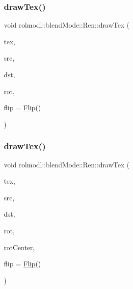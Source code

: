 \mbox{\label{classrolmodl_1_1blend_mode_1_1_ren_a9a98d8e5c0195f9f0a0a016fd9dfaf0b}} 
\subsubsection{\texorpdfstring{drawTex()}{drawTex()}\hspace{0.1cm}{\footnotesize\ttfamily [32/36]}}
{\footnotesize\ttfamily void rolmodl\+::blend\+Mode\+::\+Ren\+::draw\+Tex (\begin{DoxyParamCaption}\item[{Tex \&}]{tex,  }\item[{const \mbox{\hyperlink{structrolmodl_1_1blend_mode_1_1_src_rect_x_y}{Src\+Rect\+XY}}}]{src,  }\item[{const \mbox{\hyperlink{structrolmodl_1_1blend_mode_1_1_dst_rect_x_y}{Dst\+Rect\+XY}}}]{dst,  }\item[{const double}]{rot,  }\item[{const \mbox{\hyperlink{structrolmodl_1_1blend_mode_1_1_flip}{Flip}}}]{flip = {\ttfamily \mbox{\hyperlink{structrolmodl_1_1blend_mode_1_1_flip}{Flip}}()} }\end{DoxyParamCaption})}

\mbox{\label{classrolmodl_1_1blend_mode_1_1_ren_adf77534fcf212ab386ee2bb224ed4bce}} 
\subsubsection{\texorpdfstring{drawTex()}{drawTex()}\hspace{0.1cm}{\footnotesize\ttfamily [33/36]}}
{\footnotesize\ttfamily void rolmodl\+::blend\+Mode\+::\+Ren\+::draw\+Tex (\begin{DoxyParamCaption}\item[{Tex \&}]{tex,  }\item[{const \mbox{\hyperlink{structrolmodl_1_1blend_mode_1_1_src_rect_w_h}{Src\+Rect\+WH}}}]{src,  }\item[{const \mbox{\hyperlink{structrolmodl_1_1blend_mode_1_1_dst_rect_w_h}{Dst\+Rect\+WH}}}]{dst,  }\item[{const double}]{rot,  }\item[{const \mbox{\hyperlink{structrolmodl_1_1geom_1_1_pos}{geom\+::\+Pos}}}]{rot\+Center,  }\item[{const \mbox{\hyperlink{structrolmodl_1_1blend_mode_1_1_flip}{Flip}}}]{flip = {\ttfamily \mbox{\hyperlink{structrolmodl_1_1blend_mode_1_1_flip}{Flip}}()} }\end{DoxyParamCaption})}

